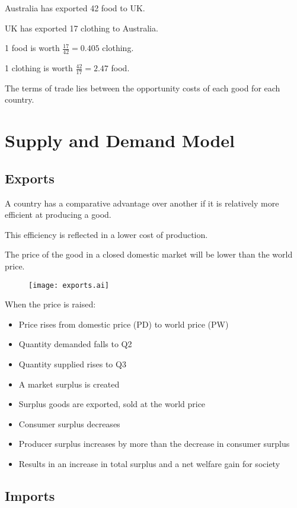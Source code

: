 \documentclass[a4paper,11pt]{article}
\begin{document}
Australia has exported 42 food to UK.

UK has exported 17 clothing to Australia.

1 food is worth $\frac{17}{42} = 0.405$ clothing.

1 clothing is worth $\frac{42}{17} = 2.47$ food.

The terms of trade lies between the opportunity costs of each good for each
country.




\section{Supply and Demand Model}

\subsection{Exports}

A country has a comparative advantage over another if it is relatively more
efficient at producing a good.

This efficiency is reflected in a lower cost of production.

The price of the good in a closed domestic market will be lower than the world
price.

\begin{figure}
\begin{center}
\texttt{[image: exports.ai]}
\end{center}
\end{figure}

When the price is raised:

\begin{itemize}
\item Price rises from domestic price (PD) to world price (PW)
\item Quantity demanded falls to Q2
\item Quantity supplied rises to Q3
\item A market surplus is created
\item Surplus goods are exported, sold at the world price
\item Consumer surplus decreases
\item Producer surplus increases by more than the decrease in consumer surplus
\item Results in an increase in total surplus and a net welfare gain for society
\end{itemize}


\subsection{Imports}
\end{document}
